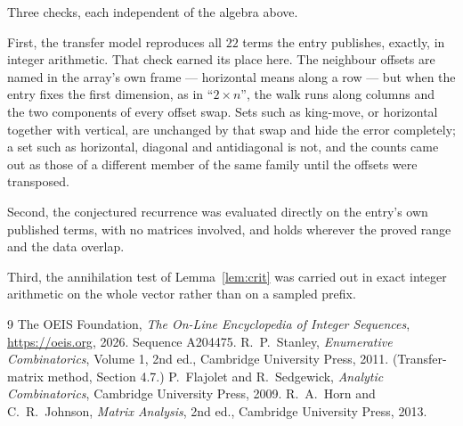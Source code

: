 \documentclass[11pt,a4paper]{article}
\theoremstyle{plain}
\theoremstyle{definition}
\begin{document}
Three checks, each independent of the algebra above.

First, the transfer model reproduces all $22$ terms the entry publishes, exactly, in
integer arithmetic. That check earned its place here. The neighbour offsets are named in the
array's own frame --- horizontal means along a row --- but when the entry fixes the first
dimension, as in ``$2\times n$'', the walk runs along columns and the two components of every
offset swap. Sets such as king-move, or horizontal together with vertical, are unchanged by
that swap and hide the error completely; a set such as horizontal, diagonal and antidiagonal
is not, and the counts came out as those of a different member of the same family until the
offsets were transposed.

Second, the conjectured recurrence was evaluated directly on the entry's own published terms,
with no matrices involved, and holds wherever the proved range and the data overlap.

Third, the annihilation test of Lemma~\ref{lem:crit} was carried out in exact integer
arithmetic on the whole vector rather than on a sampled prefix.

\begin{thebibliography}{9}
 The OEIS Foundation, \emph{The On-Line Encyclopedia of Integer
Sequences}, \url{https://oeis.org}, 2026. Sequence A204475.
 R.~P.~Stanley, \emph{Enumerative Combinatorics}, Volume 1, 2nd ed.,
Cambridge University Press, 2011. (Transfer-matrix method, Section 4.7.)
 P.~Flajolet and R.~Sedgewick, \emph{Analytic Combinatorics}, Cambridge
University Press, 2009.
 R.~A.~Horn and C.~R.~Johnson, \emph{Matrix Analysis}, 2nd ed., Cambridge
University Press, 2013.
\end{thebibliography}
\end{document}
